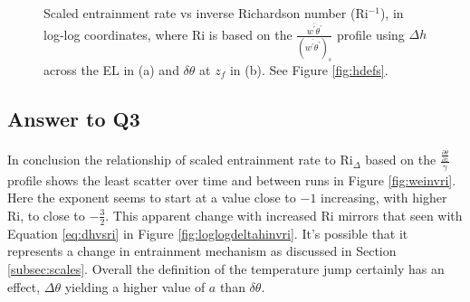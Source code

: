 \begin{figure}[htbp]
\begin{minipage}[b]{0.5\linewidth}
        \\
        \end{minipage}             
\quad
\begin{minipage}[b]{0.5\linewidth}
        \\
       
       \end{minipage}
        \caption[Scaled entrainment rate vs inverse Richardson number (ii)]{Scaled entrainment rate vs inverse Richardson number (\acs{Ri}$^{-1}$), in log-log coordinates, where \acs{Ri} is based on the $\frac{\overline{w^{'}\theta^{'}}}{(\overline{w^{'}\theta^{'}})_{s}}$
profile using $\Delta h$ across the \acs{EL} in (a) and $\delta \theta$ at $z_{f}$ in (b).  See Figure \ref{fig:hdefs}.}
        \label{fig:weinvri_f}
\end{figure}

\clearpage

\subsection{Answer to Q3}
In conclusion the relationship of scaled entrainment rate to \acs{Ri}$_{\Delta}$ based on the $\frac{\frac{\partial \overline{\theta}}{\partial z}}{\gamma}$ profile shows the least scatter over time and between runs in Figure \ref{fig:weinvri}.  Here the exponent seems to start at a value close to $-1$ increasing, with higher \acs{Ri}, to close to $-\frac{3}{2}$.  This apparent change with increased \acs{Ri} mirrors that seen with Equation \ref{eq:dhvsri} in Figure \ref{fig:loglogdeltahinvri}.  It's possible that it represents a change in entrainment mechanism as discussed in Section \ref{subsec:scales}.  Overall the definition of the temperature jump certainly has an effect, $\Delta \theta$ yielding a higher value of $a$ than $\delta \theta$.

\endinput

Any text after an \endinput is ignored.
You could put scraps here or things in progress.
